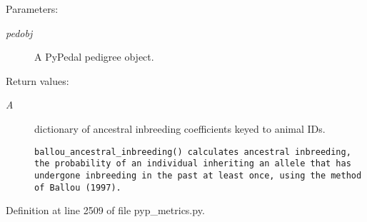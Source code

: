 \begin{Desc}
\item[Parameters:]
\begin{description}
\item[{\em pedobj}]A Py\-Pedal pedigree object. \end{description}
\end{Desc}
\begin{Desc}
\item[Return values:]
\begin{description}
\item[{\em A}]dictionary of ancestral inbreeding coefficients keyed to animal IDs.

\footnotesize\begin{verbatim}ballou_ancestral_inbreeding() calculates ancestral inbreeding,
the probability of an individual inheriting an allele that has
undergone inbreeding in the past at least once, using the method
of Ballou (1997).
\end{verbatim}
\normalsize
 \end{description}
\end{Desc}


Definition at line 2509 of file pyp\_\-metrics.py.